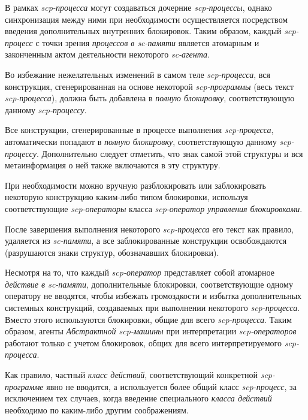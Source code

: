 \begin{SCn}
{\begin{scnitemize}
\item
  
  В рамках \textit{scp-процесса} могут создаваться дочерние
  \textit{scp-процессы}, однако синхронизация между ними при необходимости
  осуществляется посредством введения дополнительных внутренних
  блокировок. Таким образом, каждый \textit{scp-процесс} с точки зрения
  \textit{процессов в sc-памяти} является атомарным и законченным актом
  деятельности некоторого \textit{sc-агента}.
  
\item
  
  Во избежание нежелательных изменений в самом теле \textit{scp-процесса},
  вся конструкция, сгенерированная на основе некоторой
  \textit{scp-программы} (весь текст \textit{scp-процесса}), должна быть
  добавлена в \textit{полную блокировку}, соответствующую данному \textit{scp-процессу}.
  
\item
  Все конструкции, сгенерированные в процессе выполнения
  \textit{scp-процесса}, автоматически попадают в \textit{полную
  блокировку}, соответствующую данному \textit{scp-процессу}.
  Дополнительно следует отметить, что знак самой этой структуры и вся метаинформация о ней также включаются в эту структуру.
\item
  При необходимости можно вручную разблокировать или заблокировать   некоторую конструкцию каким-либо типом блокировки, используя   соответствующие \textit{scp-операторы} класса \textit{scp-оператор управления
  блокировками}.
\item
  После завершения выполнения некоторого \textit{scp-процесса} его текст как
  правило, удаляется из \textit{sc-памяти}, а все заблокированные
  конструкции освобождаются (разрушаются знаки структур, обозначавших
  блокировки).
\item
  Несмотря на то, что каждый \textit{scp-оператор} представляет собой атомарное
 \textit{действие в sc-памяти}, дополнительные блокировки, соответствующие
  одному оператору не вводятся, чтобы избежать громоздкости и избытка
  дополнительных системных конструкций, создаваемых при выполнении
  некоторого \textit{scp-процесса}. Вместо этого используются блокировки, общие
  для всего \textit{scp-процесса}. Таким образом, агенты \textit{Абстрактной scp-машины}
  при интерпретации \textit{scp-операторов} работают только с учетом блокировок,
  общих для всего интерпретируемого \textit{scp-процесса}.
\item
  Как правило, частный \textit{класс действий}, соответствующий конкретной
  \textit{scp-программе} явно не вводится, а используется более общий
  класс \textit{scp-процесс}, за исключением тех случаев, когда введение
  специального \textit{класса действий} необходимо по каким-либо другим
  соображениям.
\end{scnitemize}}


\end{SCn}
